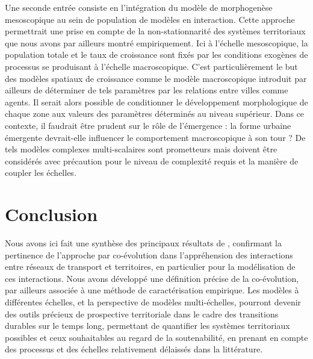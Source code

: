 \documentclass[11pt]{article}
\begin{document}
Une seconde entrée consiste en l'intégration du modèle de morphogenèse mesoscopique au sein de population de modèles en interaction. Cette approche permettrait une prise en compte de la non-stationnarité des systèmes territoriaux que nous avons par ailleurs montré empiriquement.
 Ici à l'échelle mesoscopique, la population totale et le taux de croissance sont fixés par les conditions exogènes de processus se produisant à l'échelle macroscopique. C'est particulièrement le but des modèles spatiaux de croissance comme le modèle macroscopique introduit par ailleurs de déterminer de tels paramètres par les relations entre villes comme agents. Il serait alors possible de conditionner le développement morphologique de chaque zone aux valeurs des paramètres déterminés au niveau supérieur. Dans ce contexte, il faudrait être prudent sur le rôle de l'émergence : la forme urbaine émergente devrait-elle influencer le comportement macroscopique à son tour ? De tels modèles complexes multi-scalaires sont prometteurs mais doivent être considérés avec précaution pour le niveau de complexité requis et la manière de coupler les échelles.


\section{Conclusion}

Nous avons ici fait une synthèse des principaux résultats de \cite{raimbault2018caracterisation}, confirmant la pertinence de l'approche par co-évolution dans l'appréhension des interactions entre réseaux de transport et territoires, en particulier pour la modélisation de ces interactions. Nous avons développé une définition précise de la co-évolution, par ailleurs associée à une méthode de caractérisation empirique. Les modèles à différentes échelles, et la perspective de modèles multi-échelles, pourront devenir des outils précieux de prospective territoriale dans le cadre des transitions durables sur le temps long, permettant de quantifier les systèmes territoriaux possibles et ceux souhaitables au regard de la soutenabilité, en prenant en compte des processus et des échelles relativement délaissés dans la littérature.









\end{document}
